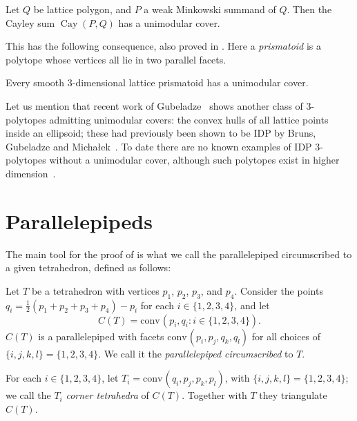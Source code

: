 \documentclass[12pt]{article}
\newcommand{\conv}{\ensuremath{\mathrm{conv}}\hspace{1pt}}
\newcommand{\cayley}{\operatorname{Cay}}
\begin{document}
\begin{theorem}
\label{thm:cayley}
Let $Q$ be lattice polygon, and $P$ a weak Minkowski summand of $Q$. Then the Cayley sum $\cayley(P,Q)$ has a unimodular cover.
\end{theorem}

This has the following consequence, also proved in .
Here a  \emph{prismatoid} is a polytope whose vertices all lie in two parallel facets. 


\begin{corollary}
\label{coro:prismatoid}
Every smooth $3$-dimensional lattice prismatoid has a unimodular cover.
\end{corollary}

Let us mention that recent work of Gubeladze~\cite{Gubeladze} shows another class of 3-polytopes admitting unimodular covers: the convex hulls of all lattice points inside an ellipsoid; these had previously been shown to be IDP by Bruns, Gubeladze and Micha{\l}ek~\cite{BGM}.
To date there are no known examples of IDP $3$-polytopes without a unimodular cover, although such polytopes exist in higher dimension~\cite{BG}.



\section{Parallelepipeds}
\label{sec:parallelepipeds}

The main tool for the proof of  is what we call the parallelepiped circumscribed to a given tetrahedron, defined as follows:

\begin{definition}
\label{def:circunpara}
Let $T$ be a tetrahedron with vertices $p_1$, $p_2$, $p_3$, and $p_4$. Consider the points $q_i= \frac12 (p_1+p_2+p_3+p_4) - p_i$ for each $i\in \{1,2,3,4\}$, and let
\[
C(T)=\conv(p_i,q_i: i\in\{1,2,3,4\}).
\] 
$C(T)$ is a parallelepiped with facets $\conv(p_i, p_j, q_k, q_l)$ for all choices of $\{i,j,k,l\}=\{1,2,3,4\}$. We call it the \emph{parallelepiped circumscribed} to $T$.

For each $i \in \{1,2,3,4\}$, let $T_i=\conv(q_i, p_j, p_k, p_l)$, with $\{i,j,k,l\}=\{1,2,3,4\}$; we call the $T_i$ \emph{corner tetrahedra} of $C(T)$. Together with $T$ they triangulate $C(T)$.
\end{definition}
\end{document}
